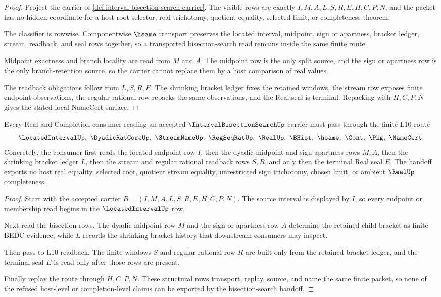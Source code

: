 \begin{proof}
Project the carrier of \autoref{def:interval-bisection-search-carrier}. The visible rows are exactly $I,M,A,L,S,R,E,H,C,P,N$, and the packet has no hidden coordinate for a host root selector, real trichotomy, quotient equality, selected limit, or completeness theorem.

The classifier is rowwise. Componentwise $\hsame$ transport preserves the located interval, midpoint, sign or apartness, bracket ledger, stream, readback, and seal rows together, so a transported bisection-search read remains inside the same finite route.

Midpoint exactness and branch locality are read from $M$ and $A$. The midpoint row is the only split source, and the sign or apartness row is the only branch-retention source, so the carrier cannot replace them by a host comparison of real values.

The readback obligations follow from $L,S,R,E$. The shrinking bracket ledger fixes the retained windows, the stream row exposes finite endpoint observations, the regular rational row repacks the same observations, and the Real seal is terminal. Repacking with $H,C,P,N$ gives the stated local NameCert surface.
\end{proof}

\begin{theorem}
\label{thm:interval-bisection-search-l10-handoff}
Every Real-and-Completion consumer reading an accepted $\IntervalBisectionSearchUp$ carrier must pass through the finite L10 route
$$
\LocatedIntervalUp,\ \DyadicRatCoreUp,\ \StreamNameUp,\ \RegSeqRatUp,\ \RealUp,\ \BHist,\ \hsame,\ \Cont,\ \Pkg,\ \NameCert .
$$
Concretely, the consumer first reads the located endpoint row $I$, then the dyadic midpoint and sign-apartness rows $M,A$, then the shrinking bracket ledger $L$, then the stream and regular rational readback rows $S,R$, and only then the terminal Real seal $E$. The handoff exports no host real equality, selected root, quotient stream equality, unrestricted sign trichotomy, chosen limit, or ambient $\RealUp$ completeness.
\end{theorem}
\begin{proof}
Start with the accepted carrier $B=(I,M,A,L,S,R,E,H,C,P,N)$. The source interval is displayed by $I$, so every endpoint or membership read begins in the $\LocatedIntervalUp$ row.

Next read the bisection rows. The dyadic midpoint row $M$ and the sign or apartness row $A$ determine the retained child bracket as finite BEDC evidence, while $L$ records the shrinking bracket history that downstream consumers may inspect.

Then pass to L10 readback. The finite windows $S$ and regular rational row $R$ are built only from the retained bracket ledger, and the terminal seal $E$ is read only after those rows are present.

Finally replay the route through $H,C,P,N$. These structural rows transport, replay, source, and name the same finite packet, so none of the refused host-level or completion-level claims can be exported by the bisection-search handoff.
\end{proof}

